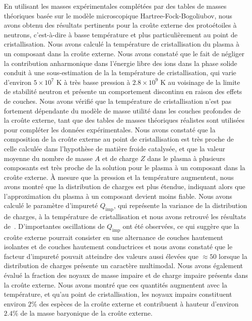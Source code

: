 En utilisant les masses expérimentales complétées par des tables de masses 
théoriques basée sur le modèle microscopique Hartree-Fock-Bogoliubov, nous 
avons obtenu des résultats pertinents pour la croûte externe des protoétoiles à
neutrons, c'est-à-dire à basse température et plus particulièrement au point de 
cristallisation.
%
Nous avons calculé la température de cristallisation du plasma à un composant 
dans la croûte externe. Nous avons constaté que le fait de négliger la 
contribution anharmonique dans l'énergie libre des ions dans la phase solide 
conduit à une sous-estimation de la la température de cristallisation, qui 
varie d'environ $5 \times 10^7$ K à très basse pression à $2.8 \times 10^9$ K 
au voisinage de la limite de stabilité neutron et présente un comportement 
discontinu en raison des effets de couches. 
Nous avons vérifié que la température de cristallisation n'est pas fortement 
dépendante du modèle de masse utilité dans les couches profondes de la croûte 
externe, tant que des tables de masses théoriques réalistes sont utilisées pour
compléter les données expérimentales.
%
Nous avons constaté que la composition de la croûte externe au point de 
cristallisation est très proche de celle calculée dans l'hypothèse de matière
froide catalysée, et que la valeur moyenne du nombre de masse $A$ et de charge 
$Z$ dans le plasma à plusieurs composants est très proche de la solution pour
le plasma à un composant dans la croûte externe. 
À mesure que la pression et la température augmentent, nous avons montré que la 
distribution de charges est plus étendue, indiquant alors que l'approximation 
du plasma à un composant devient moins fiable. 
%
Nous avons calculé le paramètre d'impureté $Q_{\text{imp}}$, qui 
représente la variance de la distribution de charges, à la température de 
cristallisation et nous avons retrouvé les résultats de~\cite{Fantina2020}.
D'importantes oscillations de $Q_{\text{imp}}$ ont été observées, ce qui 
suggère que la croûte externe pourrait consister en une alternance de 
couches hautement isolantes et de couches hautement conductrices et nous 
avons constaté que le facteur d'impureté pouvait atteindre des valeurs aussi 
élevées que $\approx 50$ lorsque la distribution de charges présente un 
caractère multimodal. 
%
Nous avons également évalué la fraction des noyaux de masse impaire et de 
charge impaire présents dans la croûte externe. Nous avons montré que ces 
quantités augmentent avec la température, et qu'au point de cristallisation, 
les noyaux impairs constituent environ $2\%$ des espèces de la croûte externe 
et contribuent à hauteur d'environ $2.4\%$ de la masse baryonique de la croûte 
externe. 

